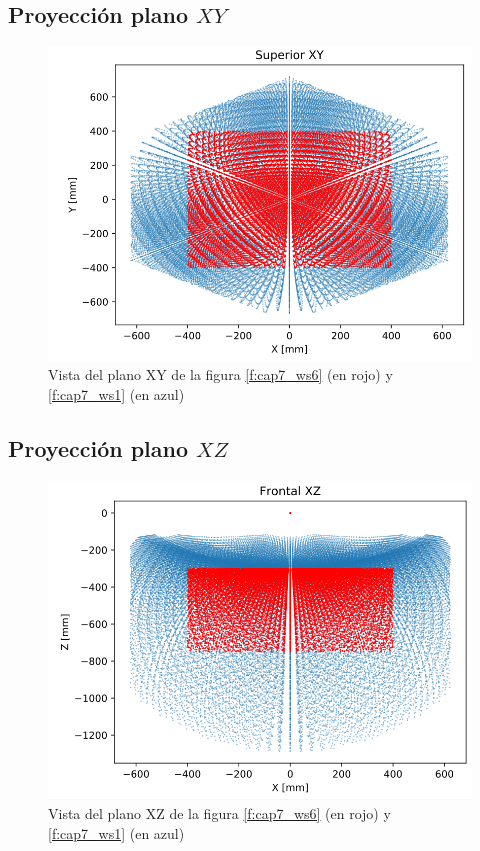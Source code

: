     \newpage

    
    \subsection{Proyección plano $XY$}
        \begin{figure}[h]
            \centering
            \includegraphics[width=0.6\linewidth]{Main/Chapter7/Images7/ws_2.png}
            \caption{Vista del plano XY de la figura \ref{f:cap7_ws6} (en rojo) y \ref{f:cap7_ws1} (en azul) }
            \label{f:cap7_ws2}
        \end{figure}  
    
    \subsection{Proyección plano $XZ$}
        \begin{figure}[h]
            \centering
            \includegraphics[width=0.6\linewidth]{Main/Chapter7/Images7/ws_3.png}
            \caption{Vista del plano XZ de la figura \ref{f:cap7_ws6} (en rojo) y \ref{f:cap7_ws1} (en azul) }
            \label{f:cap7_ws3}
        \end{figure}  
        
